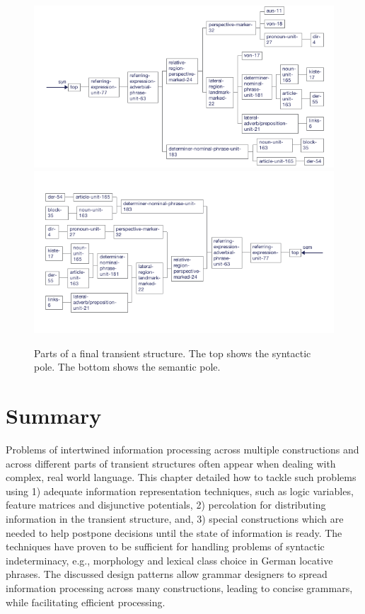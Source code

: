 \begin{figure}
\begin{centering}
\includegraphics[width=\columnwidth]{figs/parse-result-transient-syn}
\includegraphics[width=\columnwidth]{figs/parse-result-transient-sem}
\caption[Final transient structure]{Parts of a final transient structure. The top shows the syntactic pole. The bottom
shows the semantic pole.}
\end{centering}
\label{f:parse-result-transient}
\end{figure}
\section{Summary}
Problems of intertwined information processing across multiple constructions 
and across different parts of transient structures often appear when dealing 
with complex, real world language. This chapter detailed how to tackle such 
problems using 1) adequate information representation techniques, such 
as logic variables, feature matrices and disjunctive potentials,
2) percolation for distributing information in the transient structure, and, 
3) special constructions which are needed to help postpone decisions until 
the state of information is ready. The techniques have proven to be 
sufficient for handling problems of syntactic indeterminacy, e.g., 
morphology and lexical class choice in German locative phrases. 
The discussed design patterns allow grammar 
designers to spread information processing across many constructions, 
leading to concise grammars, while facilitating efficient processing. 

